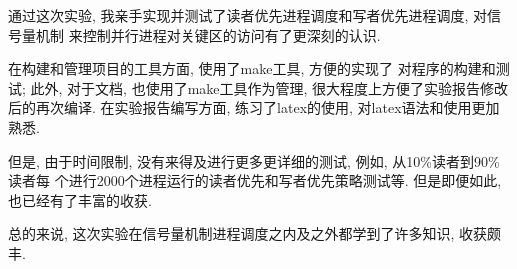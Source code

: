 \label{ssub:实验心得}
通过这次实验, 我亲手实现并测试了读者优先进程调度和写者优先进程调度, 对信号量机制
来控制并行进程对关键区的访问有了更深刻的认识.

在构建和管理项目的工具方面, 使用了make工具, 方便的实现了
对程序的构建和测试; 此外, 对于文档, 也使用了make工具作为管理,
很大程度上方便了实验报告修改后的再次编译. 在实验报告编写方面,
练习了latex的使用, 对latex语法和使用更加熟悉.\par

但是, 由于时间限制, 没有来得及进行更多更详细的测试, 例如, 从10\%读者到90\%读者每
个进行2000个进程运行的读者优先和写者优先策略测试等. 但是即便如此, 也已经有了丰富的收获.

总的来说, 这次实验在信号量机制进程调度之内及之外都学到了许多知识, 收获颇丰.
